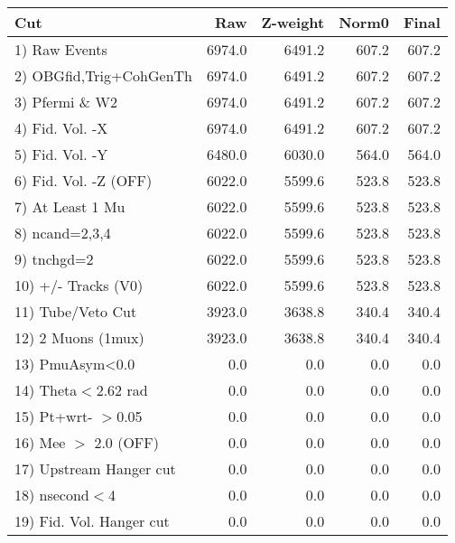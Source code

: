  \begin{table}[h!]\centering
 \begin{tabular}{||l||r|r|r|r||}
 \hline
 \hline
 Cut & Raw & Z-weight & Norm0 & Final \\
 \hline
  1) Raw Events           &      6974.0 &      6491.2 &       607.2 &       607.2 \\
  2) OBGfid,Trig+CohGenTh &      6974.0 &      6491.2 &       607.2 &       607.2 \\
  3) Pfermi \& W2         &      6974.0 &      6491.2 &       607.2 &       607.2 \\
  4) Fid. Vol. -X         &      6974.0 &      6491.2 &       607.2 &       607.2 \\
  5) Fid. Vol. -Y         &      6480.0 &      6030.0 &       564.0 &       564.0 \\
  6) Fid. Vol. -Z (OFF)   &      6022.0 &      5599.6 &       523.8 &       523.8 \\
  7) At Least 1 Mu        &      6022.0 &      5599.6 &       523.8 &       523.8 \\
  8) ncand=2,3,4          &      6022.0 &      5599.6 &       523.8 &       523.8 \\
  9) tnchgd=2             &      6022.0 &      5599.6 &       523.8 &       523.8 \\
 10) +/- Tracks (V0)      &      6022.0 &      5599.6 &       523.8 &       523.8 \\
 11) Tube/Veto Cut        &      3923.0 &      3638.8 &       340.4 &       340.4 \\
 12) 2 Muons (1mux)       &      3923.0 &      3638.8 &       340.4 &       340.4 \\
 13) PmuAsym<0.0          &         0.0 &         0.0 &         0.0 &         0.0 \\
 14) Theta$<$2.62 rad     &         0.0 &         0.0 &         0.0 &         0.0 \\
 15) Pt+wrt- $>$0.05      &         0.0 &         0.0 &         0.0 &         0.0 \\
 16) Mee $>$ 2.0  (OFF)   &         0.0 &         0.0 &         0.0 &         0.0 \\
 17) Upstream Hanger cut  &         0.0 &         0.0 &         0.0 &         0.0 \\
 18) nsecond$<$4          &         0.0 &         0.0 &         0.0 &         0.0 \\
 19) Fid. Vol. Hanger cut &         0.0 &         0.0 &         0.0 &         0.0 \\

\end{tabular}
\end{table}
